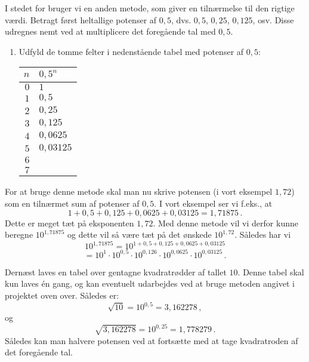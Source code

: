 \documentclass[12pt,oneside,a4paper]{article}
\theoremstyle{plain}
\begin{document}
I stedet for bruger vi en anden metode, som giver en tilnærmelse til den
rigtige værdi.  Betragt først heltallige potenser af $0,5$, dvs.
$0,5$, $0,25$, $0,125$, osv. Disse udregnes nemt ved at multiplicere
det foregående tal med $0,5$.
\begin{enumerate}[label=(\alph*)]
    \item Udfyld de tomme felter i nedenstående tabel med potenser af $0,5$:
        \begin{center}
            \begin{tabular}{|r|l|}
\hline
                $n$ & $0,5^n$ \\
                \hline
                $0$ & $1$ \\
                \hline
                $1$ & $0,5$ \\
                \hline
                $2$ & $0,25$ \\
                \hline
                $3$ & $0,125$ \\
                \hline
                $4$ & $0,0625$ \\
                \hline
                $5$ & $0,03125$ \\
                \hline
                $6$ &  \\
                \hline
                $7$ &  \\
                \hline
            \end{tabular}
        \end{center}
\end{enumerate}

For at bruge denne metode skal man nu skrive potensen (i vort eksempel $1,72$)
som en tilnærmet sum af potenser af $0,5$. I vort eksempel ser vi f.eks., at
\[
    1 + 0,5 + 0,125 + 0,0625 + 0,03125 = 1,71875 \,.
\]
Dette er meget tæt på eksponenten $1,72$. Med denne metode vil vi derfor kunne
beregne $10^{1,71875}$ og dette vil så være tæt på det ønskede $10^{1,72}$.
Således har vi
\[
    10^{1,71875} = 10^{1 + 0,5 + 0,125 + 0,0625 + 0,03125}
\]
\[
    = 10^1 \cdot 10^{0,5} \cdot 10^{0,126} \cdot 10^{0,0625} \cdot 10^{0,03125} \,.
\]

Dernæst laves en tabel over gentagne
kvadratrødder af tallet $10$. Denne tabel skal kun laves én gang, og kan
eventuelt udarbejdes ved at bruge metoden angivet i projektet oven over.
Således er:
\[
    \sqrt{10} = 10^{0,5} = 3,162278 \,,
\]
og
\[
    \sqrt{3,162278} = 10^{0,25} = 1,778279 \,.
\]
Således kan man halvere potensen ved at fortsætte med at tage kvadratroden af
det foregående tal.
\end{document}
